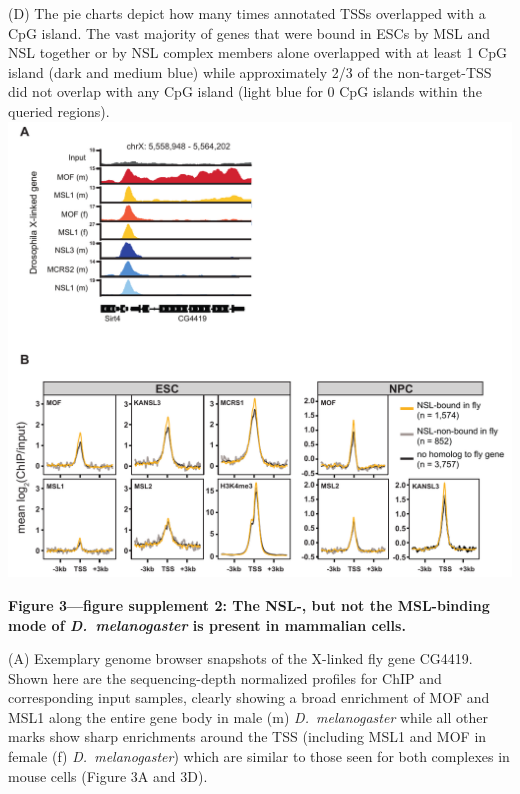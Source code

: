 \begin{footnotesize}
\begin{sffamily}
\begin{singlespacing}
(D) The pie charts depict how many times annotated TSSs overlapped with a CpG island. The vast majority of genes that were bound in ESCs by MSL and NSL together or by NSL complex members alone overlapped with at least 1 CpG island (dark and medium blue) while approximately 2/3 of the non-target-TSS did not overlap with any CpG island (light blue for 0 CpG islands within the queried regions).
\newpage
\includegraphics[width=\textwidth]{Figures/Appendix/Figure3_supplemental_figure2_scissored.pdf}

\textbf{Figure 3—figure supplement 2: The NSL-, but not the MSL-binding mode of \textit{D.~me\-la\-no\-gas\-ter} is present in mammalian cells.}

(A) Exemplary genome browser snapshots of the X-linked fly gene CG4419. Shown here are the sequencing-depth normalized profiles for ChIP and corresponding input samples, clearly showing a broad enrichment of MOF and MSL1 along the entire gene body in male (m) \textit{D.~me\-la\-no\-gas\-ter} while all other marks show sharp enrichments around the TSS (including MSL1 and MOF in female (f) \textit{D.~me\-la\-no\-gas\-ter}) which are similar to those seen for both complexes in mouse cells (Figure 3A and 3D).


\end{singlespacing}
\end{sffamily}
\end{footnotesize}
